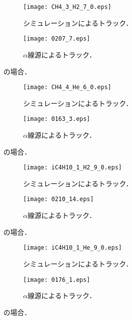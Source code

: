 \documentclass[../master]{subfiles}
\begin{document}
\begin{figure}
  \centering
  \begin{subfigure}{0.48\columnwidth}
    \centering
    \texttt{[image: CH4\_3\_H2\_7\_0.eps]}
    \caption{シミュレーションによるトラック．}
  \end{subfigure}
  \begin{subfigure}{0.48\columnwidth}
    \centering
    \texttt{[image: 0207\_7.eps]}
    \caption{$\alpha$線源によるトラック．}
  \end{subfigure}
  \caption{\MethaneHydro の場合．}
  \label{fig::track_comp_ch4_h2}
\end{figure}
\begin{figure}
  \centering
  \begin{subfigure}{0.48\columnwidth}
    \centering
    \texttt{[image: CH4\_4\_He\_6\_0.eps]}
    \caption{シミュレーションによるトラック．}
  \end{subfigure}
  \begin{subfigure}{0.48\columnwidth}
    \centering
    \texttt{[image: 0163\_3.eps]}
    \caption{$\alpha$線源によるトラック．}
  \end{subfigure}
  \caption{\MethaneHerium の場合．}
  \label{fig::track_comp_ch4_he}
\end{figure}
\begin{figure}
  \centering
  \begin{subfigure}{0.48\columnwidth}
    \centering
    \texttt{[image: iC4H10\_1\_H2\_9\_0.eps]}
    \caption{シミュレーションによるトラック．}
  \end{subfigure}
  \begin{subfigure}{0.48\columnwidth}
    \centering
    \texttt{[image: 0210\_14.eps]}
    \caption{$\alpha$線源によるトラック．}
  \end{subfigure}
  \caption{\isoButaneHydro の場合．}
  \label{fig::track_comp_ic4h10_h2}
\end{figure}
\begin{figure}
  \centering
  \begin{subfigure}{0.48\columnwidth}
    \centering
    \texttt{[image: iC4H10\_1\_He\_9\_0.eps]}
    \caption{シミュレーションによるトラック．}
  \end{subfigure}
  \begin{subfigure}{0.48\columnwidth}
    \centering
    \texttt{[image: 0176\_1.eps]}
    \caption{$\alpha$線源によるトラック．}
  \end{subfigure}
  \caption{\isoButaneHerium の場合．}
  \label{fig::track_comp_ic4h10_he}
\end{figure}
\end{document}
